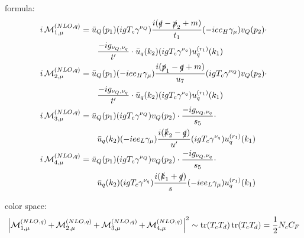 formula:
\begin{align}
i\operatorname{\mathcal M}^{(NLO,q)}_{1,\mu} &= \bar u_Q(p_1)(igT_c\gamma^{\nu_Q})\frac{i(\slashed{q}-\slashed{p}_2+m)}{t_1}(-i e e_H \gamma_\mu)v_Q(p_2)\cdot \nonumber\\
 &\hspace{20pt}\frac{-ig_{\nu_Q,\nu_q}}{t'} \cdot \bar u_q(k_2)(igT_c\gamma^{\nu_q})u^{(r_1)}_q(k_1)\\
i\operatorname{\mathcal M}^{(NLO,q)}_{2,\mu} &= \bar u_Q(p_1)(-i e e_H \gamma_\mu)\frac{i(\slashed{p}_1-\slashed{q}+m)}{u_7}(igT_c\gamma^{\nu_Q})v_Q(p_2) \cdot \nonumber\\
&\hspace{20pt} \frac{-ig_{\nu_Q,\nu_q}}{t'} \cdot \bar u_q(k_2)(igT_c\gamma^{\nu_q})u^{(r_1)}_q(k_1)\\
i\operatorname{\mathcal M}^{(NLO,q)}_{3,\mu} &= \bar u_Q(p_1)(igT_c\gamma^{\nu_Q})v_Q(p_2) \cdot \frac{-ig_{\nu_Q,\nu_q}}{s_5} \cdot \nonumber\\
 &\hspace{20pt}\bar u_q(k_2)(-i e e_L \gamma_\mu)\frac{i(\slashed{k}_2-\slashed{q})}{u'}(igT_c\gamma^{\nu_q})u^{(r_1)}_q(k_1)\\
i\operatorname{\mathcal M}^{(NLO,q)}_{4,\mu} &= \bar u_Q(p_1)(igT_c\gamma^{\nu_Q})v_Q(p_2) \cdot \frac{-ig_{\nu_Q,\nu_q}}{s_5} \cdot \nonumber\\
 &\hspace{20pt}\bar u_q(k_2)(igT_c\gamma^{\nu_q})\frac{i(\slashed{k}_1+\slashed{q})}{s}(-i e e_L \gamma_\mu)u^{(r_1)}_q(k_1)
\end{align}

color space:
\begin{equation}
\left|\operatorname{\mathcal M}^{(NLO,q)}_{1,\mu}+\operatorname{\mathcal M}^{(NLO,q)}_{2,\mu}+\operatorname{\mathcal M}^{(NLO,q)}_{3,\mu}+\operatorname{\mathcal M}^{(NLO,q)}_{4,\mu}\right|^2 \sim \operatorname{\text{tr}}(T_c T_d)\operatorname{\text{tr}}(T_c T_d) = \frac 1 2 N_c C_F
\end{equation}

